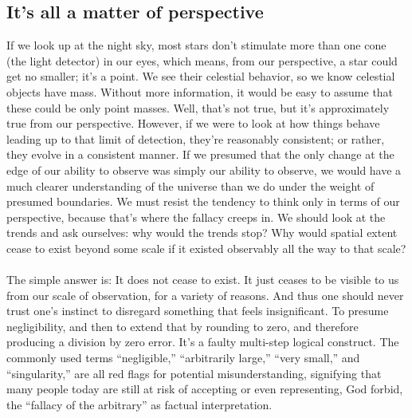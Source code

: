 \documentclass[twoside,twocolumn,9pt]{article}
\begin{document}
\subsection{It's all a matter of perspective}
If we look up at the night sky, most stars don't stimulate more than one cone (the light detector) in our eyes, which means, from our perspective, a star could get no smaller; it's a point. We see their celestial behavior, so we know celestial objects have mass. Without more information, it would be easy to assume that these could be only point masses. Well, that's not true, but it's approximately true from our perspective. However, if we were to look at how things behave leading up to that limit of detection, they're reasonably consistent; or rather, they evolve in a consistent manner. If we presumed that the only change at the edge of our ability to observe was simply our ability to observe, we would have a much clearer understanding of the universe than we do under the weight of presumed boundaries. We must resist the tendency to think only in terms of our perspective, because that's where the fallacy creeps in. We should look at the trends and ask ourselves: why would the trends stop? Why would spatial extent cease to exist beyond some scale if it existed observably all the way to that scale?\\
\\
The simple answer is: It does not cease to exist. It just ceases to be visible to us from our scale of observation, for a variety of reasons. And thus one should never trust one's instinct to disregard something that feels insignificant. To presume negligibility, and then to extend that by rounding to zero, and therefore producing a division by zero error. It's a faulty multi-step logical construct. The commonly used terms ``negligible,'' ``arbitrarily large,'' ``very small,'' and ``singularity,'' are all red flags for potential misunderstanding, signifying that many people today are still at risk of accepting or even representing, God forbid, the ``fallacy of the arbitrary'' as factual interpretation.
\end{document}

